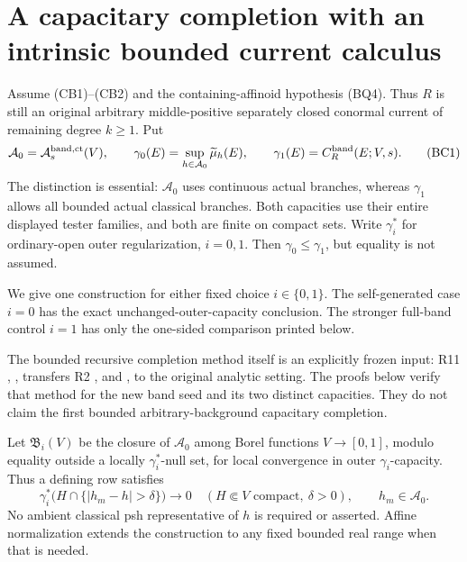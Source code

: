 \section{A capacitary completion with an intrinsic bounded current calculus}
\label{sec:r12-band-capacitary-completion}

Assume (CB1)--(CB2) and the containing-affinoid hypothesis
(BQ4). Thus $R$ is still an original arbitrary middle-positive
separately closed conormal current of remaining degree $k\geq1$.
Put
\[
 \mathcal A_0=\mathcal A_s^{\rm band,ct}(V),\qquad
 \gamma_0(E)=\sup_{h\in\mathcal A_0}\widetilde\mu_h(E),\qquad
 \gamma_1(E)=C_R^{\rm band}(E;V,s).
 \tag{BC1}
\]
The distinction is essential: $\mathcal A_0$ uses continuous
actual branches, whereas $\gamma_1$ allows all bounded actual
classical branches. Both capacities use their entire displayed
tester families, and both are finite on compact sets. Write
$\gamma_i^*$ for ordinary-open outer regularization, $i=0,1$.
Then $\gamma_0\leq\gamma_1$, but equality is not assumed.

We give one construction for either fixed choice $i\in\{0,1\}$.
The self-generated case $i=0$ has the exact unchanged-outer-capacity
conclusion. The stronger full-band control $i=1$ has only the
one-sided comparison printed below.

The bounded recursive completion method itself is an explicitly
frozen input: R11 ,
, transfers R2
,  and
, to the original analytic setting.
The proofs below verify that method for the new band seed and
its two distinct capacities. They do not claim the first bounded
arbitrary-background capacitary completion.

\begin{definition}
\label{def:r12-band-capacitary-completion}
Let $\mathfrak B_i(V)$ be the closure of $\mathcal A_0$ among
Borel functions $V\to[0,1]$, modulo equality outside a locally
$\gamma_i^*$-null set, for local convergence in outer
$\gamma_i$-capacity. Thus a defining row satisfies
\[
 \gamma_i^*\bigl(H\cap\{|h_m-h|>\delta\}\bigr)\longrightarrow0
       \quad(H\Subset V\text{ compact},\ \delta>0),
       \qquad h_m\in\mathcal A_0.
 \tag{BC2}
\]
No ambient classical psh representative of $h$ is required or
asserted. Affine normalization extends the construction to any
fixed bounded real range when that is needed.
\end{definition}

